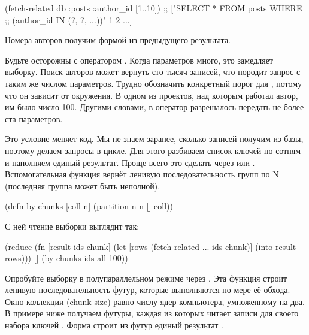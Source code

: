 \begin{english}
  \begin{clojure}
(fetch-related db :posts :author_id [1..10])
;; ["SELECT * FROM posts WHERE
;;   (author_id IN (?, ?, ...))" 1 2 ...]
  \end{clojure}
\end{english}

Номера авторов получим формой  из предыдущего результата.

Будьте осторожны с оператором . Когда параметров много, это замедляет выборку. Поиск авторов может вернуть сто тысяч записей, что породит запрос с таким же числом параметров. Трудно обозначить конкретный порог для , потому что он зависит от окружения. В одном из проектов, над которым работал автор, им было число 100. Другими словами, в оператор  разрешалось передать не более ста параметров.

Это условие меняет код. Мы не знаем заранее, сколько записей получим из базы, поэтому делаем запросы в цикле. Для этого разбиваем список ключей по сотням и наполняем единый результат. Проще всего это сделать через  или . Вспомогательная функция  вернёт ленивую последовательность групп по N (последняя группа может быть неполной).


\begin{english}
  \begin{clojure}
(defn by-chunks
  [coll n]
  (partition n n [] coll))
  \end{clojure}
\end{english}

\pagebreaklarge

С ней чтение выборки выглядит так:

\begin{english}
  \begin{clojure}
(reduce
 (fn [result ids-chunk]
   (let [rows (fetch-related ... ids-chunk)]
     (into result rows)))
 []
 (by-chunks ids-all 100))
  \end{clojure}
\end{english}

Опробуйте выборку в полупараллельном режиме через . Эта функция строит ленивую последовательность футур, которые выполняются по мере её обхода. Окно коллекции (chunk size) равно числу ядер компьютера, умноженному на два. В примере ниже получаем футуры, каждая из которых читает записи для своего набора ключей . Форма  строит из футур единый результат .

